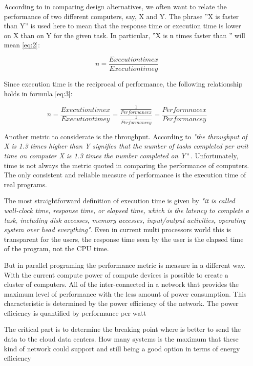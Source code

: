 According to \cite{Hennessy} in comparing design alternatives, we often want to
relate the performance of two different computers, say, X and Y. The phrase ''X
is faster than Y'' is used here to mean that the response time or execution
time is lower on X than on Y for the given task. In particular, ''X is n times
faster than ''  will mean \ref{eq:2}:

\begin{equation}\label{eq:2}
n = \frac{Execution time x}{Execution time y}
\end{equation}

Since execution time is the reciprocal of performance, the following
relationship holds in formula \ref{eq:3}:

\begin{equation}\label{eq:3}
n = \frac{Execution time x}{Execution time y} = \frac{\frac{1}{Performance
x}}{\frac{1}{Performance y}} = \frac{Performnace x}{Performance y}
\end{equation}

Another metric to considerate is the throughput. According to \cite{Hennessy}
\textit{"the throughput of X is 1.3 times higher than Y signifies that the
number of tasks completed per unit time on computer X is 1.3 times the number
completed on Y"} . Unfortunately, time is not always the metric quoted in
comparing the performance of computers. The only consistent and reliable
measure of performance is the execution time of real programs. 

The most straightforward definition of execution time is given by
\cite{Hennessy} \textit{"it is called wall-clock time, response time, or elapsed
time, which is the latency to complete a task, including disk accesses, memory
accesses, input/output activities, operating system over head everything"}.
Even in current multi processors world this is transparent for the users,  the
response time seen by the user is the elapsed time of the program, not the CPU
time.

But in parallel programing the performance metric is measure in a different
way.  With the current compute power of compute devices is possible to create a
cluster of computers. All of the inter-connected in a network that provides the
maximum level of performance with the less amount of power consumption. This
characteristic is determined by the power efficiency of the network. The power
efficiency is quantified by performance per watt \cite{Jun}

The critical part is to determine the breaking point where is better to send
the data to the cloud data centers. How many systems is the maximum that these
kind of network could support and still being a good option in terms of energy
efficiency

